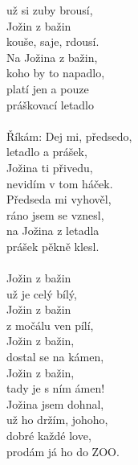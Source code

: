 \begin{multicols}{2}
už si zuby brousí, \\
Jožin z bažin\\
kouše, saje, rdousí. \\
Na Jožina z bažin,\\
koho by to napadlo,\\
platí jen a pouze\\
práškovací letadlo \\
\\
Říkám: Dej mi, předsedo,\\
letadlo a prášek,\\
Jožina ti přivedu, \\
nevidím v tom háček. \\
Předseda mi vyhověl,\\
ráno jsem se vznesl,\\
na Jožina z letadla\\
prášek pěkně klesl. \\
\\
Jožin z bažin\\
už je celý bílý, \\
Jožin z bažin\\
z močálu ven pílí, \\
Jožin z bažin,\\
dostal se na kámen, \\
Jožin z bažin,\\
tady je s ním ámen! \\
Jožina jsem dohnal,\\
už ho držím, johoho,\\
dobré každé love,\\
prodám já ho do ZOO.\\
\end{multicols}